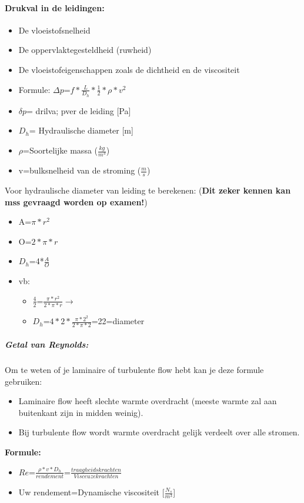 \documentclass[12pt]{article}
\begin{document}
\paragraph{Drukval in de leidingen:}
\begin{itemize}
    \item De vloeistofsnelheid
    \item De oppervlaktegesteldheid (ruwheid)
    \item De vloeistofeigenschappen zoals de dichtheid en de viscositeit
    \item[] Formule: $\Delta p$=$f*\frac{L}{D_h}*\frac{1}{2}*\rho*v^2$
    \item $\delta p$= drilva; pver de leiding [Pa]
    \item $D_h$= Hydraulische diameter [m]
    \item $\rho$=Soortelijke massa ($\frac{kg}{m^3}$)
    \item v=bulksnelheid van de stroming ($\frac{m}{s}$)
\end{itemize}
Voor hydraulische diameter van leiding te berekenen: (\textbf{Dit zeker kennen kan mss gevraagd worden op examen!})\begin{itemize}
    \item A=$\pi*r^2$
    \item O=$2*\pi*r$
    \item $D_h$=4*$\frac{A}{O}$
    \item vb:\begin{itemize}
        \item $\frac{4}{2}$=$\frac{\pi*r^2}{2*\pi*r}$$\rightarrow$
        \item $D_h$=$4*2*\frac{\pi*2^2}{2*\pi*2}$=22=diameter
    \end{itemize}
\end{itemize}
\subparagraph{Getal van Reynolds:}
Om te weten of je laminaire of turbulente flow hebt kan je deze formule gebruiken:\begin{itemize}
    \item Laminaire flow heeft slechte warmte overdracht (meeste warmte zal aan buitenkant zijn in midden weinig).
    \item Bij turbulente flow wordt warmte overdracht gelijk verdeelt over alle stromen.
\end{itemize}
\textbf{Formule:}
\begin{itemize}
    \item $Re$=$\frac{\rho*v*D_h}{rendement}$=$\frac{traagheids krachten}{Visceuze krachten}$
    \item Uw rendement=Dynamische viscositeit [$\frac{N_s}{m^3}$]
\end{itemize}
\end{document}
